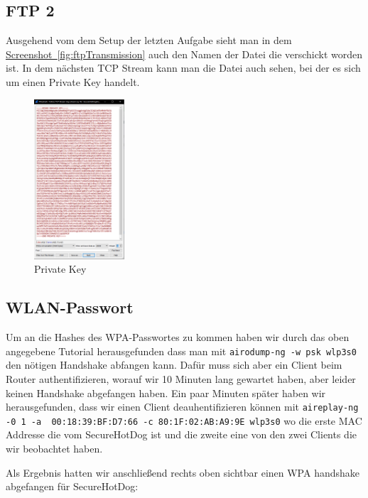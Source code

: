 \documentclass[12pt,a4paper,titlepage,oneside]{scrartcl}
\begin{document}
\subsection{FTP 2} \label{FTP2}

Ausgehend vom dem Setup der letzten Aufgabe sieht man in dem \hyperref[fig:ftpTransmission]{Screenshot~\ref*{fig:ftpTransmission}} auch den Namen der Datei die verschickt worden ist. In dem nächsten TCP Stream kann man die Datei auch sehen, bei der es sich um einen Private Key handelt.

\begin{figure}[h!]
  \centering
    \includegraphics[width=0.3\textwidth]{./imgs/intranet_screenshots/privateKey.png}
  \caption{Private Key}
  \label{fig:privateKey}
\end{figure}

\subsection{WLAN-Passwort} \label{wlanpwd}

Um an die Hashes des WPA-Passwortes zu kommen haben wir durch das oben angegebene Tutorial herausgefunden dass man mit \lstinline{airodump-ng -w psk wlp3s0} den nötigen Handshake abfangen kann. Dafür muss sich aber ein Client beim Router authentifizieren, worauf wir 10 Minuten lang gewartet haben, aber leider keinen Handshake abgefangen haben. Ein paar Minuten später haben wir herausgefunden, dass wir einen Client deauhentifizieren können mit \lstinline{aireplay-ng -0 1 -a  00:18:39:BF:D7:66 -c 80:1F:02:AB:A9:9E wlp3s0} wo die erste MAC Addresse die vom SecureHotDog ist und die zweite eine von den zwei Clients die wir beobachtet haben.

Als Ergebnis hatten wir anschließend rechts oben sichtbar einen WPA handshake abgefangen für SecureHotDog:
\end{document}
